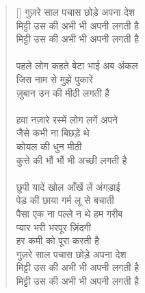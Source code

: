 \begin{verse}[\versewidth]\texthindi{
गुज़रे साल पचास छोड़े अपना देश\\
मिट्टी उस की अभी भी अपनी लगती है\\
मिट्टी उस की अभी भी अपनी लगती है\\
\\
पहले लोग कहते बेटा भाई अब अंकल\\
जिस नाम से मुझे पुकारें\\
ज़ुबान उन की मीठी लगती है\\
\\
हवा नज़ारे रस्में लोग लगें अपने\\
जैसे कभी ना बिछड़े थे\\
कोयल की धुन मीठी\\
कुत्ते की भौं भौं भी अच्छी लगती है\\
\\
छुपी यादें खोल आँखें लें अंगड़ाई\\
पेड़ की छाया गर्म लू से बचाती\\
पैसा एक ना पल्ले न थे हम गरीब\\
प्यार भरी भरपूर ज़िंदगी\\
हर कमी को पूरा करती है\\
गुज़रे साल पचास छोड़े अपना देश\\
मिट्टी उस की अभी भी अपनी लगती है\\
मिट्टी उस की अभी भी अपनी लगती है
}
\end{verse}

